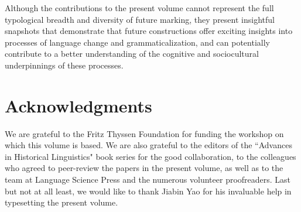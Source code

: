 \documentclass[output=paper,colorlinks,citecolor=brown]{langscibook}
\begin{document}
Although the contributions to the present volume cannot represent the full typological breadth and diversity of future marking, they present insightful snapshots that demonstrate that future constructions offer exciting insights into processes of language change and grammaticalization, and can potentially contribute to a better understanding of the cognitive and sociocultural underpinnings of these processes.


\section*{Acknowledgments}
We are grateful to the Fritz Thyssen Foundation for funding the workshop on which this volume is based. We are also grateful to the editors of the ``Advances in Historical Linguistics" book series for the good collaboration, to the colleagues who agreed to peer-review the papers in the present volume, as well as to the team at Language Science Press and the numerous volunteer proofreaders. Last but not at all least, we would like to thank Jiabin Yao for his invaluable help in typesetting the present volume.


\sloppy
\printbibliography[heading=subbibliography,notkeyword=this]
\end{document}
